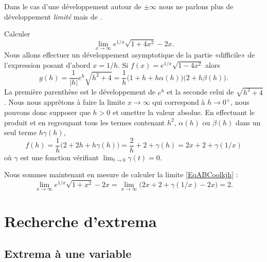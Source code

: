 Dans le cas d'une développement autour de \( \pm\infty\) nous ne parlons plus de développement \emph{limité} mais de .

\begin{example}	\label{ExBCDookjljhjk}
    Calculer
    \begin{equation}\label{EqABCoolkjh}
        \lim_{x\to \infty}  e^{1/x}\sqrt{1+4x^2}-2x.
    \end{equation}
    Nous allons effectuer un développement asymptotique de la partie «difficile» de l'expression posant d'abord $x=1/h$. Si $f(x)=e^{1/x}\sqrt{1-4x^2}$ alors
    \begin{equation}
	g(h)=\frac{1}{|h|}e^h\sqrt{h^2+4}=\frac{1}{h}\big(  1+h+h\alpha(h) \big)\big( 2+h\beta(h) \big).
    \end{equation}
    La première parenthèse est le développement de $e^h$ et la seconde celui de $\sqrt{h^2+4}$. Nous nous apprêtons à faire la limite $x\to\infty$ qui correspond à $h\to 0^+$, nous pouvons donc supposer que $h>0$ et omettre la valeur absolue. En effectuant le produit et en regroupant tous les termes contenant $h^2$, $\alpha(h)$ ou $\beta(h)$ dans un seul terme $h\gamma(h)$,
    \begin{equation}
	f(h)=\frac{1}{h}\big(  2+2h+h\gamma(h) \big)=\frac{2}{h}+2+\gamma(h)=2x+2+\gamma(1/x)
    \end{equation}
    où $\gamma$ est une fonction vérifiant $\lim_{t\to 0}\gamma(t)=0$.

    Nous sommes maintenant en mesure de calculer la limite \eqref{EqABCoolkjh} :
    \begin{equation}
	\lim_{x\to\infty}e^{1/x}\sqrt{1+x^2}-2x= \lim_{x\to \infty}\big(  2x+2+\gamma(1/x)-2x \big)=2.
    \end{equation}
\end{example}

\section{Recherche d'extrema}

\subsection{Extrema à une variable}

